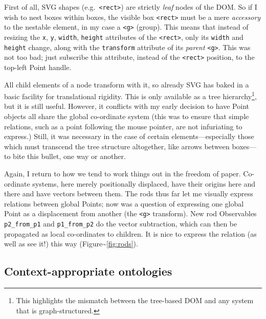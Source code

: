 First of all, SVG shapes (e.g.~\texttt{\textless{}rect\textgreater{}})
are strictly \emph{leaf} nodes of the DOM. So if I wish to nest boxes
within boxes, the visible box \texttt{\textless{}rect\textgreater{}}
must be a mere \emph{accessory} to the nestable element, in my case a
\texttt{\textless{}g\textgreater{}} (group). This means that instead of
resizing the \texttt{x}, \texttt{y}, \texttt{width}, \texttt{height}
attributes of the \texttt{\textless{}rect\textgreater{}}, only its
\texttt{width} and \texttt{height} change, along with the
\texttt{transform} attribute of its \emph{parent}
\texttt{\textless{}g\textgreater{}}. This was not too bad; just
subscribe this attribute, instead of the
\texttt{\textless{}rect\textgreater{}} position, to the top-left Point
handle.

All child elements of a node transform with it, so already SVG has baked
in a basic facility for translational rigidity. This is only available
as a tree hierarchy\footnote{This highlights the mismatch between the
  tree-based DOM and any system that is graph-structured.}, but it is
still useful. However, it conflicts with my early decision to have Point
objects all share the global co-ordinate system (this was to ensure that
simple relations, such as a point following the mouse pointer, are not
infuriating to express.) Still, it was necessary in the case of certain
elements---especially those which must transcend the tree structure
altogether, like arrows between boxes---to bite this bullet, one way or
another.

Again, I return to how we tend to work things out in the freedom of
paper. Co-ordinate systems, here merely positionally displaced, have
their origins here and there and have vectors between them. The rods
thus far let me visually express relations between global Points; now
was a question of expressing one global Point as a displacement from
another (the \texttt{\textless{}g\textgreater{}} transform). New rod
Observables \texttt{p2\_from\_p1} and \texttt{p1\_from\_p2} do the
vector subtraction, which can then be propagated as local co-ordinates
to children. It is nice to express the relation (as well as see it!)
this way (Figure\textasciitilde{}\ref{fig:rods}).

\hypertarget{context-appropriate-ontologies}{%
\subsection{Context-appropriate
ontologies}\label{context-appropriate-ontologies}}

